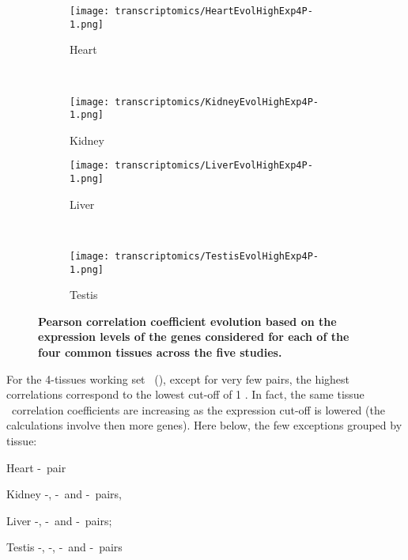 \begin{sidewaysfigure}[!htpb]
    \centering
    \begin{subfigure}[b]{0.48\textwidth}\centering
        \texttt{[image: transcriptomics/HeartEvolHighExp4P-1.png]}
        \caption{Heart}\label{fig:CorHighExpHeart4T}
    \end{subfigure}%
~%
    \begin{subfigure}[b]{0.48\textwidth}\centering
        \texttt{[image: transcriptomics/KidneyEvolHighExp4P-1.png]}
        \caption{Kidney}\label{fig:CorHighExpKidney4T}
    \end{subfigure}

    \begin{subfigure}[b]{0.48\textwidth}\centering
        \texttt{[image: transcriptomics/LiverEvolHighExp4P-1.png]}
        \caption{Liver}\label{fig:CorHighExpLiver4T}
    \end{subfigure}%
~%
    \begin{subfigure}[b]{0.48\textwidth}\centering
        \texttt{[image: transcriptomics/TestisEvolHighExp4P-1.png]}
        \caption{Testis}\label{fig:CorHighExpTestis4T}
    \end{subfigure}
    \caption[Pearson correlation coefficient evolution based on the expression
    levels of the genes considered for each of the 4 common tissues]{%
\label{fig:CorHighExp4T}\textbf{Pearson correlation coefficient evolution
    based on the expression levels of the genes considered for each of the four
    common tissues across the five studies.}}
\end{sidewaysfigure}

For the 4-tissues working set \setOne\ (),
except for very few pairs, the highest correlations correspond to
the lowest cut-off of 1 \FPKM\@.
In fact, the same tissue \trep\ correlation coefficients
are increasing as the expression cut-off is lowered
(the calculations involve then more genes).
Here below, the few exceptions grouped by tissue:
\begin{eqlist}
\item[Heart] \uhlen{}-\gtex\ pair
\item[Kidney] \uhlen{}-\gtex, \castle{}-\uhlen\ and \castle{}-\gtex\ pairs,
\item[Liver]  \vt{}-\ibm, \ibm{}-\uhlen\ and \ibm{}-\uhlen\ pairs;
\item[Testis] \ibm{}-\uhlen, \vt{}-\gtex, \vt{}-\uhlen\ and \uhlen{}-\gtex\ pairs
\end{eqlist}

